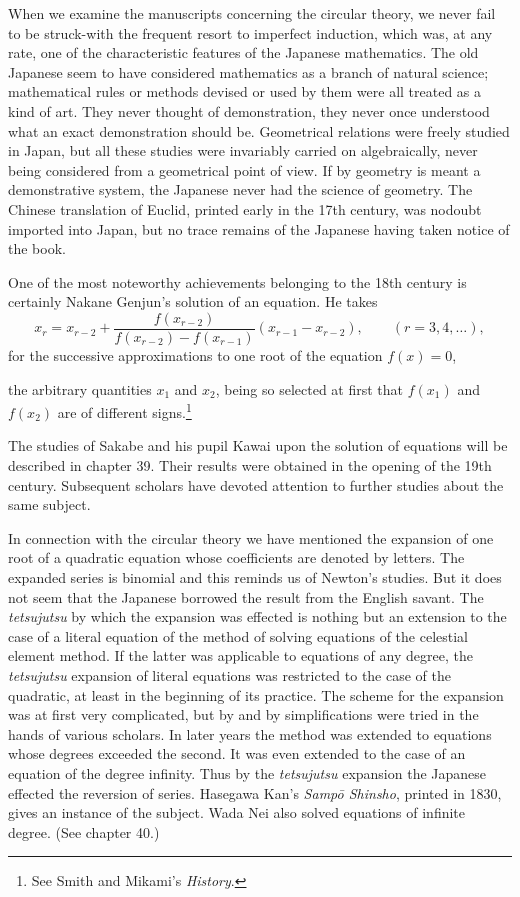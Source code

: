 \documentclass[11pt]{article}
\newcommand{\scanpage}[2]{\clearpage\setcounter{footnote}{0}\noindent{\footnotesize\color{gray}PDF page #1 · #2}\par\medskip}
\newcommand{\scanfooter}{}
\begin{document}
When we examine the manuscripts concerning the circular theory, we never fail to be struck-with the frequent resort to imperfect induction, which was, at any rate, one of the characteristic features of the Japanese mathematics. The old Japanese seem to have considered mathematics as a branch of natural science; mathematical rules or methods devised or used by them were all treated as a kind of art. They never thought of demonstration, they never once understood what an exact demonstration should be. Geometrical relations were freely studied in Japan, but all these studies were invariably carried on algebraically, never being considered from a geometrical point of view. If by geometry is meant a demonstrative system, the Japanese never had the science of geometry. The Chinese translation of Euclid, printed early in the 17th century, was nodoubt imported into Japan, but no trace remains of the Japanese having taken notice of the book.

One of the most noteworthy achievements belonging to the 18th century is certainly Nakane Genjun's solution of an equation. He takes
\[
x_r=x_{r-2}+\frac{f(x_{r-2})}{f(x_{r-2})-f(x_{r-1})}(x_{r-1}-x_{r-2}),\qquad(r=3,4,\ldots),
\]
for the successive approximations to one root of the equation $f(x)=0$,
\scanfooter

\scanpage{0181}{Chapter 22, printed page 167}
the arbitrary quantities $x_1$ and $x_2$, being so selected at first that $f(x_1)$ and $f(x_2)$ are of different signs.\footnote{See Smith and Mikami's \emph{History}.}

The studies of Sakabe and his pupil Kawai upon the solution of equations will be described in chapter 39. Their results were obtained in the opening of the 19th century. Subsequent scholars have devoted attention to further studies about the same subject.

In connection with the circular theory we have mentioned the expansion of one root of a quadratic equation whose coefficients are denoted by letters. The expanded series is binomial and this reminds us of Newton's studies. But it does not seem that the Japanese borrowed the result from the English savant. The \emph{tetsujutsu} by which the expansion was effected is nothing but an extension to the case of a literal equation of the method of solving equations of the celestial element method. If the latter was applicable to equations of any degree, the \emph{tetsujutsu} expansion of literal equations was restricted to the case of the quadratic, at least in the beginning of its practice. The scheme for the expansion was at first very complicated, but by and by simplifications were tried in the hands of various scholars. In later years the method was extended to equations whose degrees exceeded the second. It was even extended to the case of an equation of the degree infinity. Thus by the \emph{tetsujutsu} expansion the Japanese effected the reversion of series. Hasegawa Kan's \emph{Sampō Shinsho}, printed in 1830, gives an instance of the subject. Wada Nei also solved equations of infinite degree. (See chapter 40.)
\end{document}
